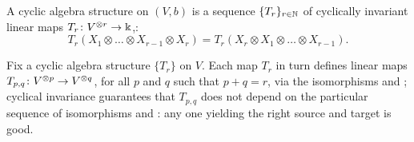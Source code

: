 \begin{definition}\label{dfn:cyclic-algebra}
  A cyclic algebra structure on $(V, b)$ is a sequence
  $\{T_r\}_{r\in\mathbb{N}}$ of cyclically invariant linear maps $T_r \colon
  V\sp{\otimes r} \to \Bbbk$,:
  \begin{equation*}
    T_r (X_1 \otimes \dots \otimes X_{r-1} \otimes X_r) = 
    T_r (X_r \otimes X_1 \otimes \dots \otimes X_{r-1}).
  \end{equation*}
\end{definition}
Fix a cyclic algebra structure $\{T_r\}$ on $V$.  Each map $T_r$
in turn defines linear maps $T_{p,q}\colon V\sp{\otimes p} \to V\sp{\otimes q}$, for all
$p$ and $q$ such that $p+q=r$, via the isomorphisms
 and ; cyclical
invariance guarantees that $T_{p,q}$ does not depend on the
particular sequence of isomorphisms  and
: any one yielding the right source and
target is good.

